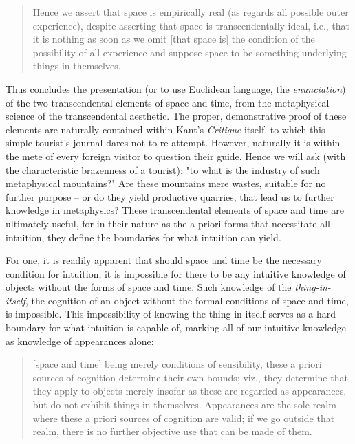 \begin{quote}
Hence we assert that space is empirically real (as regards all possible outer experience), despite asserting that space is transcendentally ideal, i.e., that it is nothing as soon as we omit [that space is] the condition of the possibility of all experience and suppose space to be something underlying things in themselves.

\autocite[B45]{hackett}
\end{quote}

Thus concludes the presentation (or to use Euclidean language, the \emph{enunciation}) of the two transcendental elements of space and time, from the metaphysical science of the transcendental aesthetic. The proper, demonstrative proof of these elements are naturally contained within Kant's \emph{Critique} itself, to which this simple tourist's journal dares not to re-attempt. However, naturally it is within the mete of every foreign visitor to question their guide. Hence we will ask (with the characteristic brazenness of a tourist): "to what is the industry of such metaphysical mountains?" Are these mountains mere wastes, suitable for no further purpose -- or do they yield productive quarries, that lead us to further knowledge in metaphysics? These transcendental elements of space and time are ultimately useful, for in their nature as the a priori forms that necessitate all intuition, they define the boundaries for what intuition can yield.

For one, it is readily apparent that should space and time be the necessary condition for intuition, it is impossible for there to be any intuitive knowledge of objects without the forms of space and time. Such knowledge of the \emph{thing-in-itself}, the cognition of an object without the formal conditions of space and time, is impossible. This impossibility of knowing the thing-in-itself serves as a hard boundary for what intuition is capable of, marking all of our intuitive knowledge as knowledge of appearances alone:

\begin{quote}
  [space and time] being merely conditions of sensibility, these a priori sources of cognition determine their own bounds; viz., they determine that they apply to objects merely insofar as these are regarded as appearances, but do not exhibit things in themselves. Appearances are the sole realm where these a priori sources of cognition are valid; if we go outside that realm, there is no further objective use that can be made of them.

  \autocite[B56]{hackett}
\end{quote}

